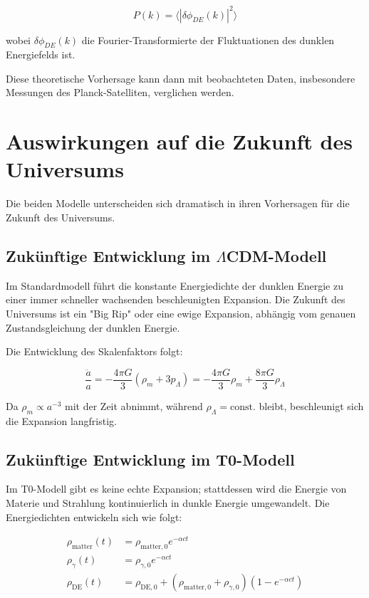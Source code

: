 \documentclass[a4paper,12pt]{article}
\theoremstyle{definition}
\theoremstyle{remark}
\begin{document}
	\begin{equation}
		P(k) = \langle|\delta\phi_{DE}(k)|^2\rangle
	\end{equation}
	
	wobei $\delta\phi_{DE}(k)$ die Fourier-Transformierte der Fluktuationen des dunklen Energiefelds ist.
	
	Diese theoretische Vorhersage kann dann mit beobachteten Daten, insbesondere Messungen des Planck-Satelliten, verglichen werden.
	
	\section{Auswirkungen auf die Zukunft des Universums}
	Die beiden Modelle unterscheiden sich dramatisch in ihren Vorhersagen für die Zukunft des Universums.
	
	\subsection{Zukünftige Entwicklung im $\Lambda$CDM-Modell}
	Im Standardmodell führt die konstante Energiedichte der dunklen Energie zu einer immer schneller wachsenden beschleunigten Expansion. Die Zukunft des Universums ist ein "Big Rip" oder eine ewige Expansion, abhängig vom genauen Zustandsgleichung der dunklen Energie.
	
	Die Entwicklung des Skalenfaktors folgt:
	
	\begin{equation}
		\frac{\ddot{a}}{a} = -\frac{4\pi G}{3}(\rho_m + 3p_\Lambda) = -\frac{4\pi G}{3}\rho_m + \frac{8\pi G}{3}\rho_\Lambda
	\end{equation}
	
	Da $\rho_m \propto a^{-3}$ mit der Zeit abnimmt, während $\rho_\Lambda = \text{const.}$ bleibt, beschleunigt sich die Expansion langfristig.
	
	\subsection{Zukünftige Entwicklung im T0-Modell}
	Im T0-Modell gibt es keine echte Expansion; stattdessen wird die Energie von Materie und Strahlung kontinuierlich in dunkle Energie umgewandelt. Die Energiedichten entwickeln sich wie folgt:
	
	\begin{align}
		\rho_{\text{matter}}(t) &= \rho_{\text{matter},0} e^{-\alpha c t} \\
		\rho_{\gamma}(t) &= \rho_{\gamma,0} e^{-\alpha c t} \\
		\rho_{\text{DE}}(t) &= \rho_{\text{DE},0} + (\rho_{\text{matter},0} + \rho_{\gamma,0})(1 - e^{-\alpha c t})
	\end{align}
	
\end{document}
